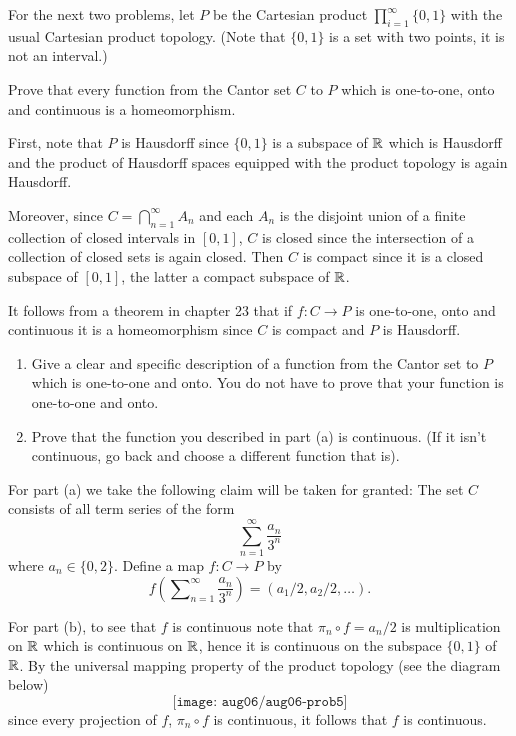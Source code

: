 For the next two problems, let \(P\) be the Cartesian product
\(\prod_{i=1}^\infty\{0,1\}\) with the usual Cartesian product
topology. (Note that \(\{0,1\}\) is a set with two points, it is not an
interval.)
\begin{problem}
  Prove that every function from the Cantor set \(C\) to \(P\) which is
  one-to-one, onto and continuous is a homeomorphism.
\end{problem}
\begin{solution}
  First, note that \(P\) is Hausdorff since \(\{0,1\}\) is a subspace of
  \(\mathbb{R}\) which is Hausdorff and the product of Hausdorff spaces equipped
  with the product topology is again Hausdorff.

  Moreover, since \(C=\bigcap_{n=1}^\infty A_n\) and each \(A_n\) is the
  disjoint union of a finite collection of closed intervals in \([0,1]\),
  \(C\) is closed since the intersection of a collection of closed sets is
  again closed. Then \(C\) is compact since it is a closed subspace of
  \([0,1]\), the latter a compact subspace of \(\mathbb{R}\).

  It follows from a theorem in chapter 23 that if \(f\colon C\to P\) is
  one-to-one, onto and continuous it is a homeomorphism since \(C\) is
  compact and \(P\) is Hausdorff.
\end{solution}

\begin{problem}
  \hfill
  \begin{enumerate}[label=(\alph*)]
  \item Give a clear and specific description of a function from the Cantor
    set to \(P\) which is one-to-one and onto. You do not have to prove
    that your function is one-to-one and onto.
  \item Prove that the function you described in part (a) is
    continuous. (If it isn't continuous, go back and choose a different
    function that is).
  \end{enumerate}
\end{problem}
\begin{solution}
  For part (a) we take the following claim will be taken for granted: The
  set \(C\) consists of all term series of the form
  \[
    \sum_{n=1}^\infty\frac{a_n}{3^n}
  \]
  where \(a_n\in\{0,2\}\). Define a map \(f\colon C\to P\) by
  \[
    f\left(\sum\nolimits_{n=1}^\infty\frac{a_n}{3^n}\right)=(a_1/2,a_2/2,\ldots).
  \]

  For part (b), to see that \(f\) is continuous note that
  \(\pi_n\circ f=a_n/2\) is multiplication on \(\mathbb{R}\) which is continuous
  on \(\mathbb{R}\), hence it is continuous on the subspace \(\{0,1\}\) of
  \(\mathbb{R}\). By the universal mapping property of the product topology (see
  the diagram below)
  \[
    \texttt{[image: aug06/aug06-prob5]}
  \]
  since every projection of \(f\), \(\pi_n\circ f\) is continuous, it
  follows that \(f\) is continuous.
\end{solution}

